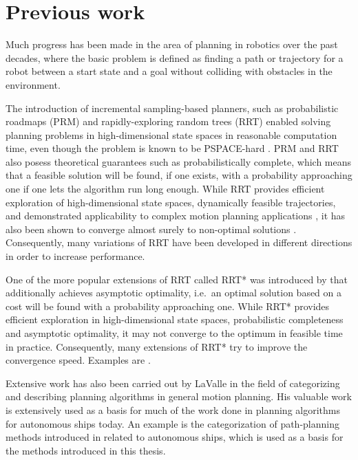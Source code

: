 \iffalse
Motivation
* Digital twin
	* Not only dependent on metric distances
* More efficient routes
	* Reduce environmental impact
	* Increase economic growth
	* ++
* Easy to use
* Proposed algorithms
	* Validate
\fi



\section{Previous work}

Much progress has been made in the area of planning in robotics over the past decades, where the basic problem is defined as finding a path or trajectory for a robot between a start state and a goal without colliding with obstacles in the environment.

The introduction of incremental sampling-based planners, such as probabilistic roadmaps (PRM) and rapidly-exploring random trees (RRT) enabled solving planning problems in high-dimensional state spaces in reasonable computation time, even though the problem is known to be PSPACE-hard \parencite{latombe1991}. PRM and RRT also posess theoretical guarantees such as probabilistically complete, which means that a feasible solution will be found, if one exists, with a probability approaching one if one lets the algorithm run long enough. While RRT provides efficient exploration of high-dimensional state spaces, dynamically feasible trajectories, and demonstrated applicability to complex motion planning applications \parencite{kuwata2009},  it has also been shown to converge almost surely to non-optimal solutions \parencite{sertac2011}. Consequently, many variations of RRT have been developed in different directions in order to increase performance. 

One of the more popular extensions of RRT called RRT* was introduced by \cite{sertac2011} that additionally achieves asymptotic optimality, i.e.\ an optimal solution based on a cost will be found with a probability approaching one. While RRT* provides efficient exploration in high-dimensional state spaces, probabilistic completeness and asymptotic optimality, it may not converge to the optimum in feasible time in practice. Consequently, many extensions of RRT* try to improve the convergence speed. Examples are \parencite{lee2017}.




Extensive work has also been carried out by LaValle in the field of categorizing and describing planning algorithms in general motion planning. His valuable work is extensively used as a basis for much of the work done in planning algorithms for autonomous ships today. An example is the categorization of path-planning methods introduced in \cite{bitar2017} related to autonomous ships, which is used as a basis for the methods introduced in this thesis. 

